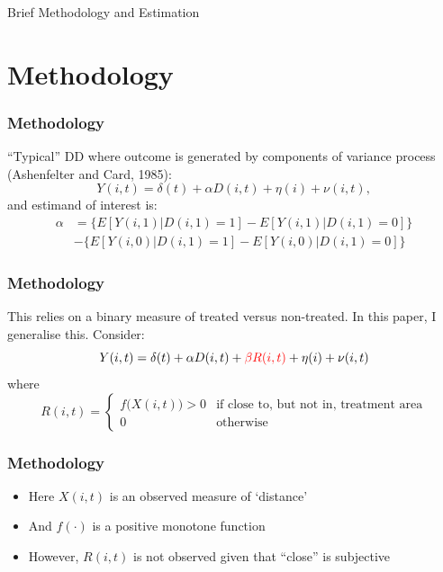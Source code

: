\documentclass[10pt,letterpaper,subeqn]{beamer}
\begin{document}
\begin{frame}
\begin{center}
\Large Brief Methodology and Estimation
\end{center}
\end{frame}


\section{Methodology}
\begin{frame}[label=method1]
  \frametitle{Methodology}
``Typical'' DD where outcome is generated by components of variance 
process (Ashenfelter and Card, 1985):
\vspace{4mm}
\begin{equation}
\label{Seqn:COV}
Y(i,t)=\delta(t) + \alpha D(i,t)+\eta(i)+\nu(i,t),
\end{equation}
\vspace{4mm}
and estimand of interest is:
\vspace{4mm}
\begin{eqnarray}
\label{Seqn:DD}
\alpha&=\{E[Y(i,1)|D(i,1)=1]-E[Y(i,1)|D(i,1)=0]\} \\ \nonumber
      &-\{E[Y(i,0)|D(i,1)=1]-E[Y(i,0)|D(i,1)=0]\}
\end{eqnarray}
\end{frame}

\begin{frame}[label=method2]
  \frametitle{Methodology}
This relies on a binary measure of treated versus non-treated.  In this paper,
I generalise this.  Consider:
\vspace{5mm}
\begin{equation}
\label{Seqn:COV2}
Y(i,t)=\delta(t) + \alpha D(i,t)+\textcolor{red}{\beta R(i,t)}+\eta(i)+\nu(i,t)
\end{equation}
\vspace{3mm}
where
\vspace{3mm}
\[
 R(i,t) =
  \begin{cases}
   f\Big(X(i,t)\Big)>0   & \text{if close to, but not in, treatment area} \\ 
   0                            & \text{otherwise} 
  \end{cases}
\]

\end{frame}

\begin{frame}[label=method3]
  \frametitle{Methodology}
\begin{itemize}
\item Here $X(i,t)$ is an observed measure of `distance'
\item And $f(\cdot)$ is a positive monotone function
\item However, $R(i,t)$ is not observed given that ``close'' is subjective
\end{itemize}
\end{frame}
\end{document}
